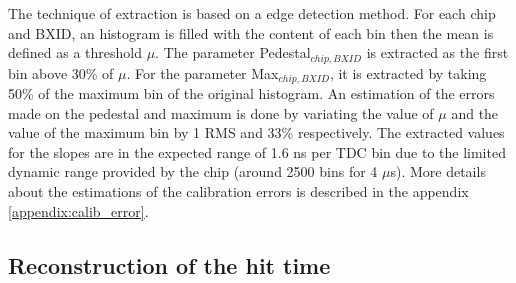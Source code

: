 \documentclass[twoside,a4paper,11pt]{article}
\begin{document}
The technique of extraction is based on a edge detection method. For each chip and BXID, an histogram is filled with the content of each bin then the mean is defined as a threshold $\mu$. The parameter Pedestal$_{chip, BXID}$ is extracted as the first bin above 30\% of $\mu$. For the parameter Max$_{chip, BXID}$, it is extracted by taking 50\% of the maximum bin of the original histogram. An estimation of the errors made on the pedestal and maximum is done by variating the value of $\mu$ and the value of the maximum bin by 1 RMS and 33\% respectively.
The extracted values for the slopes are in the expected range of 1.6 ns per TDC bin due to the limited dynamic range provided by the chip (around 2500 bins for 4 $\mu$s). More details about the estimations of the calibration errors is described in the appendix \ref{appendix:calib_error}.

\subsection{Reconstruction of the hit time}
\end{document}
